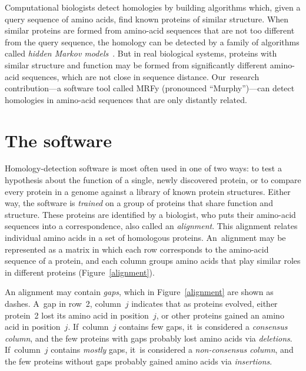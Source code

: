 \documentclass[preprint,nonatbib,blockstyle,nocopyrightspace,times]{sigplanconf}
\newcommand\figref[1]{Figure~\ref{#1}}
\newcommand\secref[1]{Section~\ref{sec:#1}}
\let\cite\citep
\begin{document}
Computational biologists detect homologies by building 
algorithms which, given a {query sequence} of amino acids,
find known proteins of similar structure.
When similar proteins are formed from amino-acid sequences that
are not too different from the query sequence, the homology can be
detected by
a family of algorithms called 
\textit{hidden Markov models}~\cite{Eddy:1998ut}.
But in real biological systems,
proteins with similar structure and function may be formed from significantly 
different amino-acid sequences, which are not close in sequence distance.
Our~research contribution---a software tool called MRFy (pronounced
``Murphy'')---can detect homologies 
in amino-acid sequences that are only distantly related.
%
%

%
%
%


\section{The software}



Homology-detection software is most often used in one of two ways:
to test a hypothesis about 
the function of a single, newly discovered protein, or 
to compare every protein in a genome against a library of known protein 
structures.
Either way, 
the software is \emph{trained}
on a group of proteins that share function and structure.
These proteins are identified by a biologist, who puts
their amino-acid sequences into a correspondence, also called an
\emph{alignment}. 
This alignment relates individual amino acids in a set of homologous proteins.
An~alignment may be represented as a matrix
in which each row corresponds to the amino-acid sequence of a protein,
and each column groups amino acids that play similar roles in
different proteins (Figure~\ref{alignment}).


An alignment may contain \emph{gaps}, which in 
\figref{alignment} are shown as dashes.
A~gap in row~2, column~$j$ indicates that as proteins evolved, either 
protein~2 lost its amino acid in position~$j$, or 
other proteins gained an amino acid in position~$j$.
If~column~$j$ contains few gaps, 
it~is considered a \emph{consensus column},
and the few proteins with gaps probably lost amino acids via
\emph{deletions}.
If~column~$j$ contains \emph{mostly} gaps, 
it~is considered a \emph{non-consensus column},
and the few proteins without gaps probably gained amino acids via
\emph{insertions}. 
\end{document}

